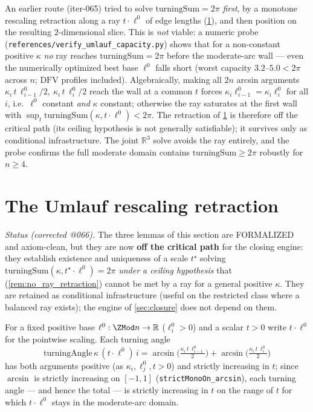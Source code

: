\begin{remark}
  \label{rem:no_ray_retraction}
  An earlier route (iter-065) tried to solve $\mathrm{turningSum} = 2\pi$
  \emph{first}, by a monotone rescaling retraction along a ray $t \cdot \ell^0$
  of edge lengths (\cref{sec:umlauf}), and then position on the resulting
  $2$-dimensional slice. This is \emph{not} viable: a numeric probe
  (\texttt{references/verify\_umlauf\_capacity.py}) shows that for a non-constant
  positive $\kappa$ \emph{no} ray reaches $\mathrm{turningSum} = 2\pi$ before the
  moderate-arc wall --- even the numerically optimized best base $\ell^0$ falls
  short (worst capacity $3.2$--$5.0 < 2\pi$ across $n$; $\mathrm{DFV}$ profiles
  included). Algebraically, making all $2n$ arcsin arguments
  $\kappa_i\,t\,\ell^0_{i-1}/2,\ \kappa_i\,t\,\ell^0_i/2$ reach the wall at a
  common $t$ forces $\kappa_i\ell^0_{i-1} = \kappa_i\ell^0_i$ for all $i$, i.e.\
  $\ell^0$ constant \emph{and} $\kappa$ constant; otherwise the ray saturates at
  the first wall with $\sup_t \mathrm{turningSum}(\kappa, t\cdot\ell^0) < 2\pi$.
  The retraction of \cref{sec:umlauf} is therefore off the critical path (its
  ceiling hypothesis is not generally satisfiable); it survives only as
  conditional infrastructure. The joint $\mathbb{R}^3$ solve avoids the ray
  entirely, and the probe confirms the full moderate domain contains
  $\mathrm{turningSum} \ge 2\pi$ robustly for $n \ge 4$.
\end{remark}

\section{The Umlauf rescaling retraction}
\label{sec:umlauf}

\emph{Status (corrected @066).} The three lemmas of this section are FORMALIZED
and axiom-clean, but they are now \textbf{off the critical path} for the closing
engine: they establish existence and uniqueness of a scale $t^\star$ solving
$\mathrm{turningSum}(\kappa, t^\star\cdot\ell^0) = 2\pi$ \emph{under a ceiling
hypothesis} that (\cref{rem:no_ray_retraction}) cannot be met by a ray for a
general positive $\kappa$. They are retained as conditional infrastructure
(useful on the restricted class where a balanced ray exists); the engine of
\cref{sec:closure} does not depend on them.

For a fixed positive base $\ell^0 : \ZMod n \to \mathbb{R}$ ($\ell^0_i > 0$) and
a scalar $t > 0$ write $t \cdot \ell^0$ for the pointwise scaling. Each turning
angle
\[
  \mathrm{turningAngle}\,\kappa\,(t\cdot\ell^0)\,i
    = \arcsin\!\Big(\tfrac{\kappa_i\,t\,\ell^0_{i-1}}{2}\Big)
    + \arcsin\!\Big(\tfrac{\kappa_i\,t\,\ell^0_i}{2}\Big)
\]
has both arguments positive (as $\kappa_i, \ell^0_j, t > 0$) and strictly
increasing in $t$; since $\arcsin$ is strictly increasing on $[-1,1]$
(\texttt{strictMonoOn\_arcsin}), each turning angle — and hence the total — is
strictly increasing in $t$ on the range of $t$ for which $t\cdot\ell^0$ stays in
the moderate-arc domain.

